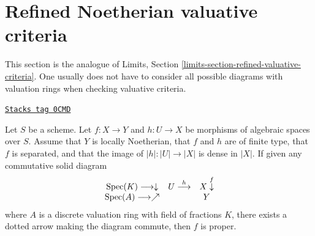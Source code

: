 \section{Refined Noetherian valuative criteria}
\label{spaces-limits-section-refined-valuative-criteria}
This section is the analogue of
Limits, Section \ref{limits-section-refined-valuative-criteria}.
One usually does not have to consider all possible diagrams with
valuation rings when checking valuative criteria.

\begin{lemma}
\label{spaces-limits-lemma-refined-valuative-criterion-proper}
\href{https://stacks.math.columbia.edu/tag/0CMD}{\texttt{Stacks tag 0CMD}}

Let $S$ be a scheme. Let $f : X \to Y$ and $h : U \to X$ be
morphisms of algebraic spaces over $S$. Assume that $Y$ is
locally Noetherian, that $f$ and $h$ are of finite type,
that $f$ is separated, and that the image of $|h| : |U| \to |X|$
is dense in $|X|$. If given any commutative solid diagram
$$
\begin{array}{ccc}\operatorname{Spec}(K) \longrightarrow\downarrow & U \overset{h}{\longrightarrow} & X \overset{f}{\downarrow} \\ \operatorname{Spec}(A) \longrightarrow\nearrow &  & Y\end{array}
$$
where $A$ is a discrete valuation ring with field of fractions $K$, there
exists a dotted arrow making the diagram commute, then $f$ is proper.
\end{lemma}

